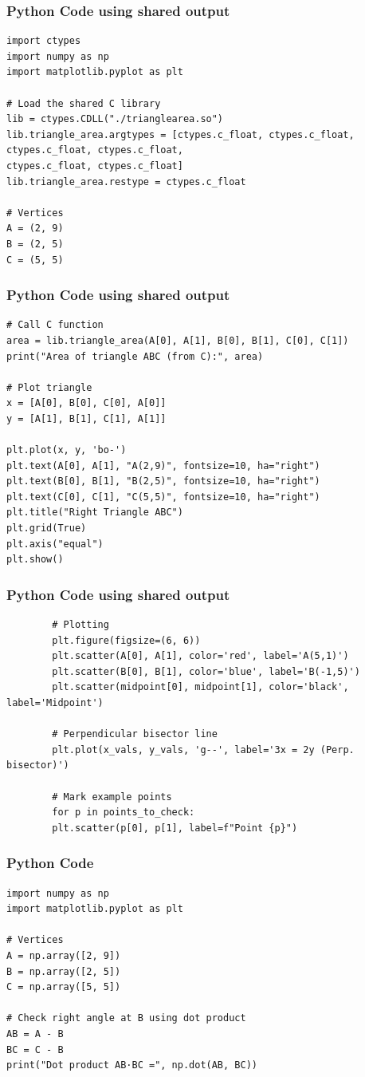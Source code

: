 \documentclass{beamer}
\begin{document}
\begin{frame}[fragile]
	\frametitle{Python Code using shared output}
	\begin{lstlisting}
import ctypes
import numpy as np
import matplotlib.pyplot as plt

# Load the shared C library
lib = ctypes.CDLL("./trianglearea.so")
lib.triangle_area.argtypes = [ctypes.c_float, ctypes.c_float,
ctypes.c_float, ctypes.c_float,
ctypes.c_float, ctypes.c_float]
lib.triangle_area.restype = ctypes.c_float

# Vertices
A = (2, 9)
B = (2, 5)
C = (5, 5)
	\end{lstlisting}
\end{frame}
\begin{frame}[fragile]
	\frametitle{Python Code using shared output}
	\begin{lstlisting}		
# Call C function
area = lib.triangle_area(A[0], A[1], B[0], B[1], C[0], C[1])
print("Area of triangle ABC (from C):", area)

# Plot triangle
x = [A[0], B[0], C[0], A[0]]
y = [A[1], B[1], C[1], A[1]]

plt.plot(x, y, 'bo-')
plt.text(A[0], A[1], "A(2,9)", fontsize=10, ha="right")
plt.text(B[0], B[1], "B(2,5)", fontsize=10, ha="right")
plt.text(C[0], C[1], "C(5,5)", fontsize=10, ha="right")
plt.title("Right Triangle ABC")
plt.grid(True)
plt.axis("equal")
plt.show()
	\end{lstlisting}
\end{frame}
\begin{frame}[fragile]
	\frametitle{Python Code using shared output}
	\begin{lstlisting}
		# Plotting
		plt.figure(figsize=(6, 6))
		plt.scatter(A[0], A[1], color='red', label='A(5,1)')
		plt.scatter(B[0], B[1], color='blue', label='B(-1,5)')
		plt.scatter(midpoint[0], midpoint[1], color='black', label='Midpoint')
		
		# Perpendicular bisector line
		plt.plot(x_vals, y_vals, 'g--', label='3x = 2y (Perp. bisector)')
		
		# Mark example points
		for p in points_to_check:
		plt.scatter(p[0], p[1], label=f"Point {p}")
	\end{lstlisting}
\end{frame}
\begin{frame}[fragile]
	\frametitle{Python Code}
	\begin{lstlisting}
import numpy as np
import matplotlib.pyplot as plt

# Vertices
A = np.array([2, 9])
B = np.array([2, 5])
C = np.array([5, 5])

# Check right angle at B using dot product
AB = A - B
BC = C - B
print("Dot product AB·BC =", np.dot(AB, BC))

	\end{lstlisting}
\end{frame}
\end{document}
